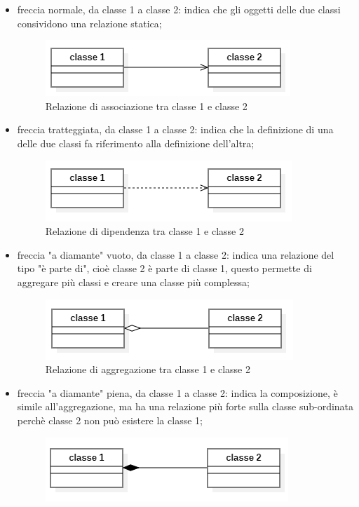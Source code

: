 \begin{itemize}
	\item freccia normale, da classe 1 a classe 2: indica che gli oggetti delle due classi consividono una relazione statica;
	\begin{figure}[H]
		\centering\includegraphics{../immagini/normeUML/frecSempl.png}
		\caption{Relazione di associazione tra classe 1 e classe 2}
	\end{figure}

	\item freccia tratteggiata, da classe 1 a classe 2: indica che la definizione di una delle due classi fa riferimento alla definizione dell'altra;
	\begin{figure}[H]
		\centering\includegraphics{../immagini/normeUML/frecTrat.png}
		\caption{Relazione di dipendenza tra classe 1 e classe 2}
	\end{figure}
	\item freccia "a diamante" vuoto, da classe 1 a classe 2: indica una relazione del tipo "è parte di", cioè classe 2 è parte di classe 1, questo permette di aggregare più classi e creare una classe più complessa;
	\begin{figure}[H]
		\centering\includegraphics{../immagini/normeUML/frecDiamVuot.png}
		\caption{Relazione di aggregazione tra classe 1 e classe 2}
	\end{figure}
	\item freccia "a diamante" piena, da classe 1 a classe 2: indica la composizione, è simile all'aggregazione, ma ha una relazione più forte sulla classe sub-ordinata perchè classe 2 non può esistere la classe 1;
	\begin{figure}[H]
		\centering\includegraphics{../immagini/normeUML/frecDiamPien.png}

\end{figure}
\end{itemize}
